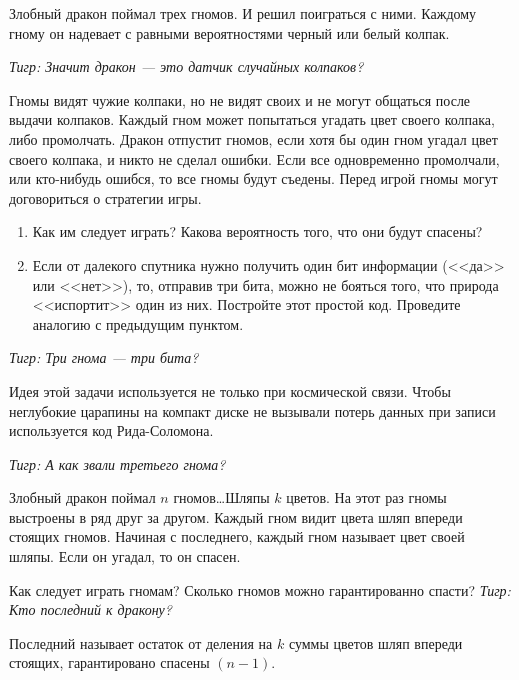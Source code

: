 \begin{problem}[Гномы]\par

Злобный дракон поймал трех гномов. И решил поиграться с ними. Каждому гному он надевает с равными вероятностями черный или белый колпак. \par

{\it Тигр: Значит дракон --- это датчик случайных колпаков?} \par

Гномы видят чужие колпаки, но не видят своих и не могут общаться после выдачи колпаков. Каждый гном может попытаться угадать цвет своего колпака, либо промолчать. Дракон отпустит гномов, если хотя бы один гном угадал цвет своего колпака, и никто не сделал ошибки. Если все одновременно промолчали, или кто-нибудь ошибся, то все гномы будут съедены. Перед игрой гномы могут договориться о стратегии игры.\par

\begin{enumerate}
\item Как им следует играть? Какова вероятность того, что они будут спасены?\par
\item Если от далекого спутника нужно получить один бит информации (<<да>> или <<нет>>), то, отправив три бита, можно не бояться того, что природа <<испортит>> один из них. Постройте этот простой код. Проведите аналогию с предыдущим пунктом. 
\end{enumerate}

{\it Тигр: Три гнома --- три бита?}\par

Идея этой задачи используется не только при космической связи. Чтобы неглубокие царапины на компакт диске не вызывали потерь данных при записи используется код Рида-Соломона.\par
{\it Тигр: А как звали третьего гнома?}\par



\begin{sol}

\end{sol}
\end{problem}



\begin{problem}\par
Злобный дракон поймал  $n$  гномов\ldots Шляпы $k$ цветов. На этот раз гномы выстроены в ряд друг за другом. Каждый гном видит цвета шляп впереди стоящих гномов. Начиная с последнего, каждый гном называет цвет своей шляпы. Если он угадал, то он спасен.\par

Как следует играть гномам? Сколько гномов можно гарантированно спасти?
{\it Тигр: Кто последний к дракону?}

\begin{sol}
Последний называет остаток от деления на $k$ суммы цветов шляп впереди стоящих, гарантировано спасены $(n-1)$.
\end{sol}

\end{problem}



